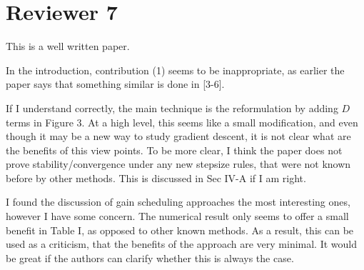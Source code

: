 \section*{Reviewer 7}\label{sec:reviewer7}
\renewcommand{\theequation}{R7.\arabic{equation}}
\setcounter{equation}{0}
\begin{rebuttal}
    {%
        This is a well written paper.
    }%
    {%
    }%
\end{rebuttal}
\begin{rebuttal}
    {%
        In the introduction, contribution (1) seems to be inappropriate, as earlier the paper says that something similar is done in [3-6].
    }%
    {%
    }%
\end{rebuttal}
\begin{rebuttal}
    {%
        If I understand correctly, the main technique is the reformulation by adding $D$ terms in Figure 3. At a high level, this seems like a small modification, and even though it may be a new way to study gradient descent, it is not clear what are the benefits of this view points. To be more clear, I think the paper does not prove stability/convergence under any new stepsize rules, that were not known before by other methods. This is discussed in Sec IV-A if I am right.
    }%
    {%
    }%
\end{rebuttal}
\begin{rebuttal}
    {%
        I found the discussion of gain scheduling approaches the most interesting ones, however I have some concern. The numerical result only seems to offer a small benefit in Table I, as opposed to other known methods. As a result, this can be used as a criticism, that the benefits of the approach are very minimal. It would be great if the authors can clarify whether this is always the case.
    }%
    {%
    }%
\end{rebuttal}
